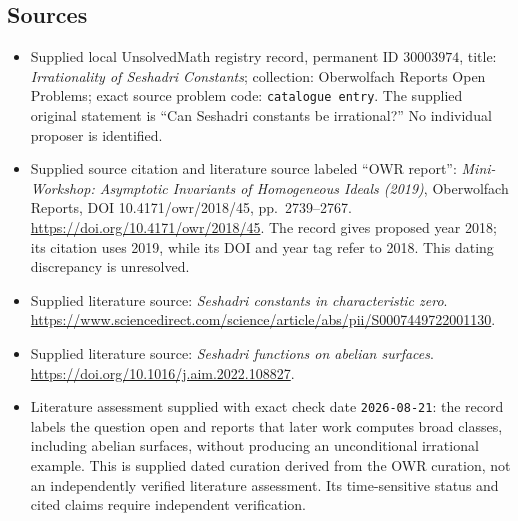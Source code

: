 \documentclass[11pt]{article}
\begin{document}
\subsection{Sources}
\begin{itemize}
\item Supplied local UnsolvedMath registry record, permanent ID \(30003974\), title: \emph{Irrationality of Seshadri Constants}; collection: Oberwolfach Reports Open Problems; exact source problem code: \texttt{catalogue entry}. The supplied original statement is ``Can Seshadri constants be irrational?'' No individual proposer is identified.
\item Supplied source citation and literature source labeled ``OWR report'': \emph{Mini-Workshop: Asymptotic Invariants of Homogeneous Ideals (2019)}, Oberwolfach Reports, DOI 10.4171/owr/2018/45, pp.\ 2739--2767. \url{https://doi.org/10.4171/owr/2018/45}. The record gives proposed year 2018; its citation uses 2019, while its DOI and year tag refer to 2018. This dating discrepancy is unresolved.
\item Supplied literature source: \emph{Seshadri constants in characteristic zero}. \url{https://www.sciencedirect.com/science/article/abs/pii/S0007449722001130}.
\item Supplied literature source: \emph{Seshadri functions on abelian surfaces}. \url{https://doi.org/10.1016/j.aim.2022.108827}.
\item Literature assessment supplied with exact check date \texttt{2026-08-21}: the record labels the question open and reports that later work computes broad classes, including abelian surfaces, without producing an unconditional irrational example. This is supplied dated curation derived from the OWR curation, not an independently verified literature assessment. Its time-sensitive status and cited claims require independent verification.
\end{itemize}
\end{document}
